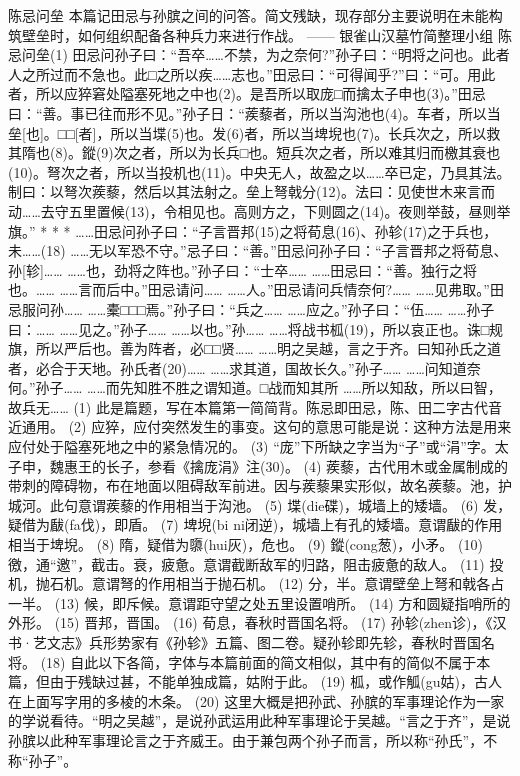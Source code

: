 \documentclass[12pt,UTF8]{ctexbook}
\begin{document}
陈忌问垒
本篇记田忌与孙膑之间的问答。简文残缺，现存部分主要说明在未能构筑壁垒时，如何组织配备各种兵力来进行作战。
—— 银雀山汉墓竹简整理小组
陈忌问垒(1)
田忌问孙子曰：“吾卒……不禁，为之奈何?”孙子曰：“明将之问也。此者人之所过而不急也。此□之所以疾……志也。”田忌曰：“可得闻乎?”曰：“可。用此者，所以应猝窘处隘塞死地之中也(2)。是吾所以取庞□而擒太子申也(3)。”田忌曰：“善。事已往而形不见。”孙子日：“蒺藜者，所以当沟池也(4)。车者，所以当垒[也]。□□[者]，所以当堞(5)也。发(6)者，所以当埤堄也(7)。长兵次之，所以救其隋也(8)。鏦(9)次之者，所以为长兵□也。短兵次之者，所以难其归而檄其衰也(10)。弩次之者，所以当投机也(11)。中央无人，故盈之以……卒已定，乃具其法。制曰：以弩次蒺藜，然后以其法射之。垒上弩戟分(12)。法曰：见使{世木}来言而动……去守五里置候(13)，令相见也。高则方之，下则圆之(14)。夜则举鼓，昼则举旗。”
* * *
……田忌问孙子曰：“子言晋邦(15)之将荀息(16)、孙轸(17)之于兵也，未……(18)
……无以军恐不守。”忌子曰：“善。”田忌问孙子曰：“子言晋邦之将荀息、孙[轸]……
……也，劲将之阵也。”孙子曰：“士卒……
……田忌曰：“善。独行之将也。……
……言而后中。”田忌请问……
……人。”田忌请问兵情奈何?……
……见弗取。”田忌服问孙……
……橐□□□焉。”孙子曰：“兵之……
……应之。”孙子曰：“伍……
……孙子曰：……
……见之。”孙子……
……以也。”孙……
……将战书柧(19)，所以哀正也。诛□规旗，所以严后也。善为阵者，必□□贤……
……明之吴越，言之于齐。曰知孙氏之道者，必合于天地。孙氏者(20)……
……求其道，国故长久。”孙子……
……问知道奈何。”孙子……
……而先知胜不胜之谓知道。□战而知其所
……所以知敌，所以曰智，故兵无……
(1) 此是篇题，写在本篇第一简简背。陈忌即田忌，陈、田二字古代音近通用。
(2) 应猝，应付突然发生的事变。这句的意思可能是说：这种方法是用来应付处于隘塞死地之中的紧急情况的。
(3) “庞”下所缺之字当为“子”或“涓”字。太子申，魏惠王的长子，参看《擒庞涓》注(30)。
(4) 蒺藜，古代用木或金属制成的带刺的障碍物，布在地面以阻碍敌军前进。因与蒺藜果实形似，故名蒺藜。池，护城河。此句意谓蒺藜的作用相当于沟池。
(5) 堞(die碟)，城墙上的矮墙。
(6) 发，疑借为瞂(fa伐)，即盾。
(7) 埤堄(bi ni闭逆)，城墙上有孔的矮墙。意谓瞂的作用相当于埤堄。
(8) 隋，疑借为隳(hui灰)，危也。
(9) 鏦(cong葱)，小矛。
(10) 徼，通“邀”，截击。衰，疲惫。意谓截断敌军的归路，阻击疲惫的敌人。
(11) 投机，抛石机。意谓弩的作用相当于抛石机。
(12) 分，半。意谓壁垒上弩和戟各占一半。
(13) 候，即斥候。意谓距守望之处五里设置哨所。
(14) 方和圆疑指哨所的外形。
(15) 晋邦，晋国。
(16) 荀息，春秋时晋国名将。
(17) 孙轸(zhen诊)，《汉书·艺文志》兵形势家有《孙轸》五篇、图二卷。疑孙轸即先轸，春秋时晋国名将。
(18) 自此以下各简，字体与本篇前面的简文相似，其中有的简似不属于本篇，但由于残缺过甚，不能单独成篇，姑附于此。
(19) 柧，或作觚(gu姑)，古人在上面写字用的多棱的木条。
(20) 这里大概是把孙武、孙膑的军事理论作为一家的学说看待。“明之吴越”，是说孙武运用此种军事理论于吴越。“言之于齐”，是说孙膑以此种军事理论言之于齐威王。由于兼包两个孙子而言，所以称“孙氏”，不称“孙子”。
\end{document}
